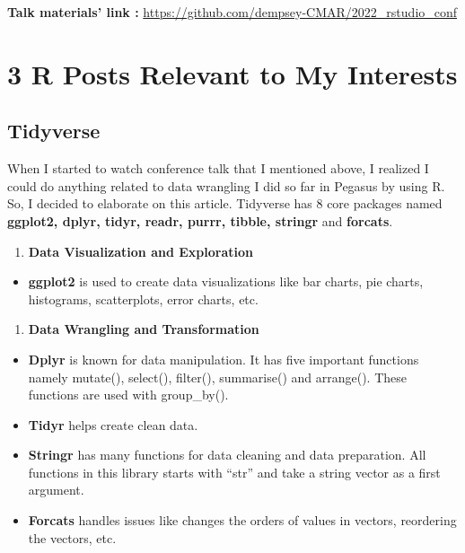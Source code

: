 \documentclass[
  letterpaper,
  DIV=11,
  numbers=noendperiod]{scrreprt}
\providecommand{\tightlist}{%
  \setlength{\itemsep}{0pt}\setlength{\parskip}{0pt}}\usepackage{longtable,booktabs,array}
\begin{document}
\textbf{Talk materials' link :}
\url{https://github.com/dempsey-CMAR/2022_rstudio_conf}

\hypertarget{r-posts-relevant-to-my-interests}{%
\section{3 R Posts Relevant to My
Interests}\label{r-posts-relevant-to-my-interests}}

\hypertarget{tidyverse}{%
\subsection{Tidyverse}\label{tidyverse}}

When I started to watch conference talk that I mentioned above, I
realized I could do anything related to data wrangling I did so far in
Pegasus by using R. So, I decided to elaborate on this article.
Tidyverse has 8 core packages named \textbf{ggplot2, dplyr, tidyr,
readr, purrr, tibble, stringr} and \textbf{forcats}.

\begin{enumerate}
\def\labelenumi{\arabic{enumi}.}
\tightlist
\item
  \textbf{Data Visualization and Exploration}
\end{enumerate}

\begin{itemize}
\tightlist
\item
  \textbf{ggplot2} is used to create data visualizations like bar
  charts, pie charts, histograms, scatterplots, error charts, etc.
\end{itemize}

\begin{enumerate}
\def\labelenumi{\arabic{enumi}.}
\setcounter{enumi}{1}
\tightlist
\item
  \textbf{Data Wrangling and Transformation}
\end{enumerate}

\begin{itemize}
\item
  \textbf{Dplyr} is known for data manipulation. It has five important
  functions namely mutate(), select(), filter(), summarise() and
  arrange(). These functions are used with group\_by().
\item
  \textbf{Tidyr} helps create clean data.
\item
  \textbf{Stringr} has many functions for data cleaning and data
  preparation. All functions in this library starts with ``str'' and
  take a string vector as a first argument.
\item
  \textbf{Forcats} handles issues like changes the orders of values in
  vectors, reordering the vectors, etc.
\end{itemize}
\end{document}
